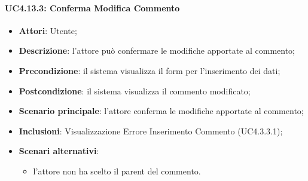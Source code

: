\begin{itemize}
\begin{itemize}
\begin{itemize}
\begin{itemize}
\paragraph{UC4.13.3: Conferma Modifica Commento}
\label{UC4.13.3}
\begin{itemize}
	\item \textbf{Attori}: Utente;
	\item \textbf{Descrizione}: l'attore può confermare le modifiche apportate al commento;
	\item \textbf{Precondizione}: il sistema visualizza il form per l'inserimento dei dati;
	\item \textbf{Postcondizione}: il sistema visualizza il commento modificato;
	\item \textbf{Scenario principale}: l'attore conferma le modifiche apportate al commento;
	\item \textbf{Inclusioni}:
	Visualizzazione Errore Inserimento Commento (UC4.3.3.1);
	\item \textbf{Scenari alternativi}:
	\begin{itemize}
	\item l'attore non ha scelto il parent del commento.
	\end{itemize}
\end{itemize}


\end{itemize}
\end{itemize}
\end{itemize}
\end{itemize}
